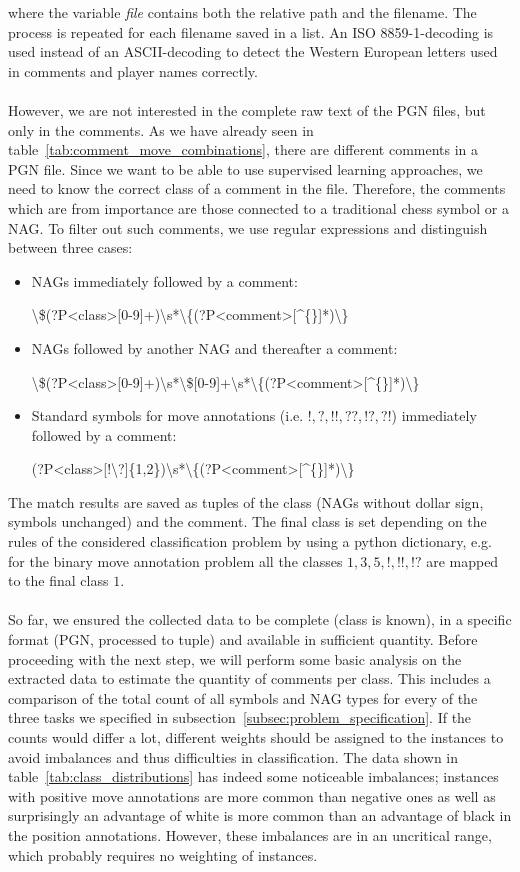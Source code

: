 \documentclass[article,type=msc,colorback,accentcolor=tud7b]{tudthesis}
\begin{document}
    where the variable \textit{file} contains both the relative path and the filename. The process is repeated for each filename saved in a list. An ISO 8859-1-decoding is used instead of an ASCII-decoding to detect the Western European letters used in comments and player names correctly. \\\\
    However, we are not interested in the complete raw text of the PGN files, but only in the comments. As we have already seen in table~\ref{tab:comment_move_combinations}, there are different comments in a PGN file. Since we want to be able to use supervised learning approaches, we need to know the correct class of a comment in the file. Therefore, the comments which are from importance are those connected to a traditional chess symbol or a NAG. To filter out such comments, we use regular expressions and distinguish between three cases:
    \begin{itemize}
      \item NAGs immediately followed by a comment:

        \textbackslash\$(?P<class>[0-9]+)\textbackslash s*\textbackslash\{(?P<comment>[\^{}\{\}]*)\textbackslash\}
      \item NAGs followed by another NAG and thereafter a comment:

        \textbackslash\$(?P<class>[0-9]+)\textbackslash s*\textbackslash\$[0-9]+\textbackslash s*\textbackslash\{(?P<comment>[\^{}\{\}]*)\textbackslash\}
      \item Standard symbols for move annotations (i.e. $!,?,!!,??,!?,?!$) immediately followed by a comment:

        (?P<class>[!\textbackslash?]\{1,2\})\textbackslash s*\textbackslash\{(?P<comment>[\^{}\{\}]*)\textbackslash\}
    \end{itemize}
    The match results are saved as tuples of the class (NAGs without dollar sign, symbols unchanged) and the comment. The final class is set depending on the rules of the considered classification problem by using a python dictionary, e.g. for the binary move annotation problem all the classes $1, 3, 5, !, !!, !?$ are mapped to the final class $1$. \\\\
    So far, we ensured the collected data to be complete (class is known), in a specific format (PGN, processed to tuple) and available in sufficient quantity. Before proceeding with the next step, we will perform some basic analysis on the extracted data to estimate the quantity of comments per class. This includes a comparison of the total count of all symbols and NAG types for every of the three tasks we specified in subsection~\ref{subsec:problem_specification}. If the counts would differ a lot, different weights should be assigned to the instances to avoid imbalances and thus difficulties in classification. The data shown in table~\ref{tab:class_distributions} has indeed some noticeable imbalances; instances with positive move annotations are more common than negative ones as well as surprisingly an advantage of white is more common than an advantage of black in the position annotations. However, these imbalances are in an uncritical range, which probably requires no weighting of instances.
\end{document}
